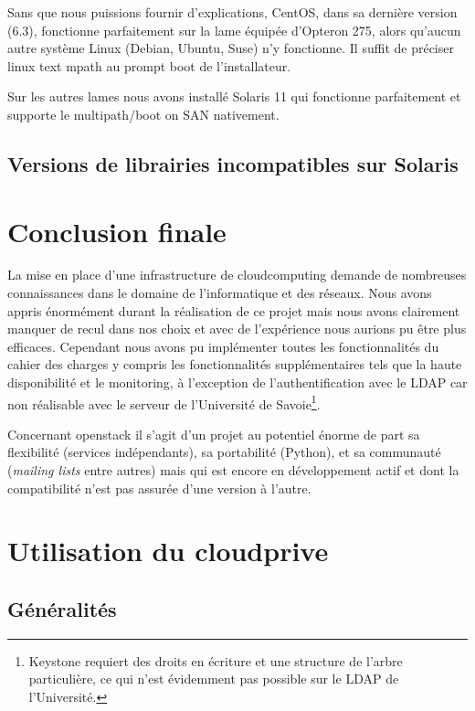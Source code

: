 \documentclass[a4paper,oneside]{report}
\begin{document}
Sans que nous puissions fournir d'explications, CentOS, dans sa dernière version (6.3), fonctionne parfaitement sur la lame équipée d'Opteron 275, alors qu'aucun autre système Linux (Debian, Ubuntu, Suse) n'y fonctionne.
Il suffit de préciser linux text mpath au prompt boot de l'installateur.

Sur les autres lames nous avons installé Solaris 11 qui fonctionne parfaitement et supporte le multipath/boot on SAN nativement.

\section{Versions de librairies incompatibles sur Solaris}
\label{sec:libsolaris}

\chapter{Conclusion finale}
La mise en place d'une infrastructure de \gls{cloudcomputing} demande de nombreuses connaissances dans le domaine de l'informatique et des réseaux.
Nous avons appris énormément durant la réalisation de ce projet mais nous avons clairement manquer de recul dans nos choix et avec de l'expérience nous aurions pu être plus efficaces.\newline
Cependant nous avons pu implémenter toutes les fonctionnalités du cahier des charges y compris les fonctionnalités supplémentaires tels que la haute disponibilité et le monitoring, à l'exception de l'authentification avec le LDAP car non réalisable avec le serveur de l'Université de Savoie\footnote{Keystone requiert des droits en écriture et une structure de l'arbre particulière, ce qui n'est évidemment pas possible sur le LDAP de l'Université.}.

Concernant \gls{openstack} il s'agit d'un projet au potentiel énorme de part sa flexibilité (services indépendants), sa portabilité (Python), et sa communauté (\emph{mailing lists} entre autres) mais qui est encore en développement actif et dont la compatibilité n'est pas assurée d'une version à l'autre.




\appendix
\chapter{Utilisation du \gls{cloudprive}}
\section{Généralités}
\end{document}
